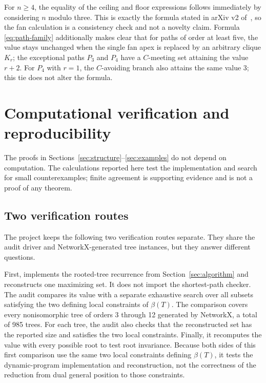 \documentclass[11pt,a4paper]{article}
\numberwithin{equation}{section}
\begin{document}
For \(n\ge 4\), the equality of the ceiling and floor expressions follows
immediately by considering \(n\) modulo three. This is exactly the formula
stated in arXiv v2 of~\cite{tian-et-al-removal}, so the fan calculation is a
consistency check and not a novelty claim. Formula \eqref{eq:path-family} additionally makes clear
that for paths of order at least five, the value stays unchanged when
the single fan apex is replaced by an arbitrary clique \(K_r\); the
exceptional paths \(P_3\) and \(P_4\) have a \(C\)-meeting set attaining
the value \(r+2\). For \(P_4\) with \(r=1\), the \(C\)-avoiding branch
also attains the same value \(3\); this tie does not alter the formula.

\section{Computational verification and reproducibility}\label{sec:computation}

The proofs in Sections~\ref{sec:structure}--\ref{sec:examples} do not depend on computation. The
calculations reported here test the implementation and search for small
counterexamples; finite agreement is supporting evidence and is not a
proof of any theorem.

\subsection{Two verification routes}\label{sec:independent-checks}

The project keeps the following two verification routes separate. They share
the audit driver and NetworkX-generated tree instances, but they answer
different questions.

First,  implements the rooted-tree
recurrence from Section~\ref{sec:algorithm} and reconstructs one maximizing set. It does
not import the shortest-path checker. The audit compares its value with
a separate exhaustive search over all subsets satisfying the two
defining local constraints of \(\beta(T)\). The comparison covers every
nonisomorphic tree of orders 3 through 12 generated by NetworkX, a total
of 985 trees. For each tree, the audit also checks that the
reconstructed set has the reported size and satisfies the two local
constraints. Finally, it recomputes the value with every possible root
to test root invariance. Because both sides of this first comparison use the
same two local constraints defining \(\beta(T)\), it tests the dynamic-program
implementation and reconstruction, not the correctness of the reduction from
dual general position to those constraints.
\end{document}

